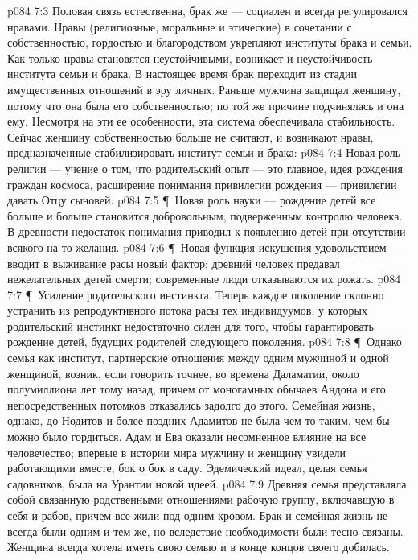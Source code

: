 \vs p084 7:3 Половая связь естественна, брак же --- социален и всегда регулировался нравами. Нравы (религиозные, моральные и этические) в сочетании с собственностью, гордостью и благородством укрепляют институты брака и семьи. Как только нравы становятся неустойчивыми, возникает и неустойчивость института семьи и брака. В настоящее время брак переходит из стадии имущественных отношений в эру личных. Раньше мужчина защищал женщину, потому что она была его собственностью; по той же причине подчинялась и она ему. Несмотря на эти ее особенности, эта система обеспечивала стабильность. Сейчас женщину собственностью больше не считают, и возникают нравы, предназначенные стабилизировать институт семьи и брака:
\vs p084 7:4 \bibnobreakspace Новая роль религии --- учение о том, что родительский опыт --- это главное, идея рождения граждан космоса, расширение понимания привилегии рождения --- привилегии давать Отцу сыновей.
\vs p084 7:5 \P\ \bibnobreakspace Новая роль науки --- рождение детей все больше и больше становится добровольным, подверженным контролю человека. В древности недостаток понимания приводил к появлению детей при отсутствии всякого на то желания.
\vs p084 7:6 \P\ \bibnobreakspace Новая функция искушения удовольствием --- вводит в выживание расы новый фактор; древний человек предавал нежелательных детей смерти; современные люди отказываются их рожать.
\vs p084 7:7 \P\ \bibnobreakspace Усиление родительского инстинкта. Теперь каждое поколение склонно устранить из репродуктивного потока расы тех индивидуумов, у которых родительский инстинкт недостаточно силен для того, чтобы гарантировать рождение детей, будущих родителей следующего поколения.
\vs p084 7:8 \P\ Однако семья как институт, партнерские отношения между одним мужчиной и одной женщиной, возник, если говорить точнее, во времена Даламатии, около полумиллиона лет тому назад, причем от моногамных обычаев Андона и его непосредственных потомков отказались задолго до этого. Семейная жизнь, однако, до Нодитов и более поздних Адамитов не была чем\hyp{}то таким, чем бы можно было гордиться. Адам и Ева оказали несомненное влияние на все человечество; впервые в истории мира мужчину и женщину увидели работающими вместе, бок о бок в саду. Эдемический идеал, целая семья садовников, была на Урантии новой идеей.
\vs p084 7:9 Древняя семья представляла собой связанную родственными отношениями рабочую группу, включавшую в себя и рабов, причем все жили под одним кровом. Брак и семейная жизнь не всегда были одним и тем же, но вследствие необходимости были тесно связаны. Женщина всегда хотела иметь свою семью и в конце концов своего добилась.
